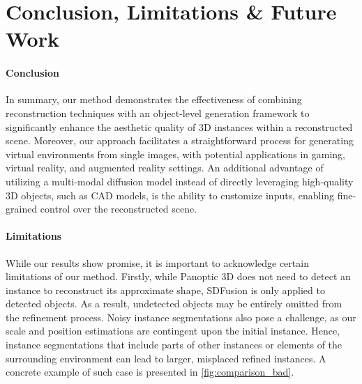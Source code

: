 \section{Conclusion, Limitations \& Future Work}
\label{sec:limitations}

\paragraph{Conclusion}
In summary, our method demonstrates the effectiveness of combining reconstruction techniques with an object-level generation framework to significantly enhance the aesthetic quality of 3D instances within a reconstructed scene.
Moreover, our approach facilitates a straightforward process for generating virtual environments from single images, with potential applications in gaming, virtual reality, and augmented reality settings.
An additional advantage of utilizing a multi-modal diffusion model instead of directly leveraging high-quality 3D objects, such as CAD models, is the ability to customize inputs, enabling fine-grained control over the reconstructed scene.

\paragraph{Limitations}
While our results show promise, it is important to acknowledge certain limitations of our method.
Firstly, while Panoptic 3D does not need to detect an instance to reconstruct its approximate shape, SDFusion is only applied to detected objects.
As a result, undetected objects may be entirely omitted from the refinement process.
Noisy instance segmentations also pose a challenge, as our scale and position estimations are contingent upon the initial instance.
Hence, instance segmentations that include parts of other instances or elements of the surrounding environment can lead to larger, misplaced refined instances.
A concrete example of such case is presented in \cref{fig:comparison_bad}.

